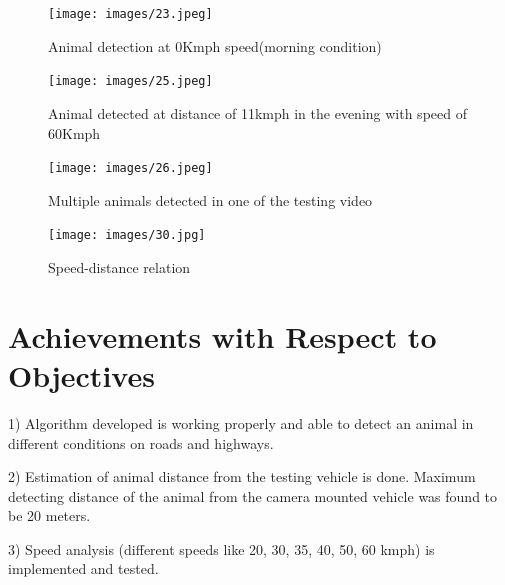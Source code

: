\documentclass[14pt,a4paper,final]{extreport}
\begin{document}
\begin{figure}[h]
	\begin{center}
		\texttt{[image: images/23.jpeg]}
		\vspace{.1 cm}
		\caption[Animal detection at 0Kmph speed(morning condition)]{Animal detection at 0Kmph speed(morning condition)}
	\end{center}
\end{figure}
\begin{figure}[h]
	\begin{center}
		\texttt{[image: images/25.jpeg]}
		\vspace{.1 cm}
		\caption[Animal detected at distance of 11kmph in the evening with speed of 60Kmph]{Animal detected at distance of 11kmph in the evening with speed of 60Kmph}
	\end{center}
\end{figure}

\begin{figure}[h]
	\begin{center}
		\texttt{[image: images/26.jpeg]}
		\vspace{.1 cm}
		\caption[Multiple animals detected in one of the testing video]{Multiple animals detected in one of the testing video}
	\end{center}
\end{figure}

\begin{figure}[h]
	\begin{center}
		\texttt{[image: images/30.jpg]}
		\vspace{.1 cm}
		\caption[Speed-distance relation]{Speed-distance relation}
	\end{center}
\end{figure}

\chapter{Achievements with Respect to Objectives}
\item 1) Algorithm developed is working properly and able to detect an animal in different conditions on roads and highways.

\item 2) Estimation of animal distance from the testing vehicle is done. Maximum detecting distance of the animal from the camera mounted vehicle was found to be 20 meters.

\item 3) Speed analysis (different speeds like 20, 30, 35, 40, 50, 60 kmph) is implemented and tested.
\end{document}
